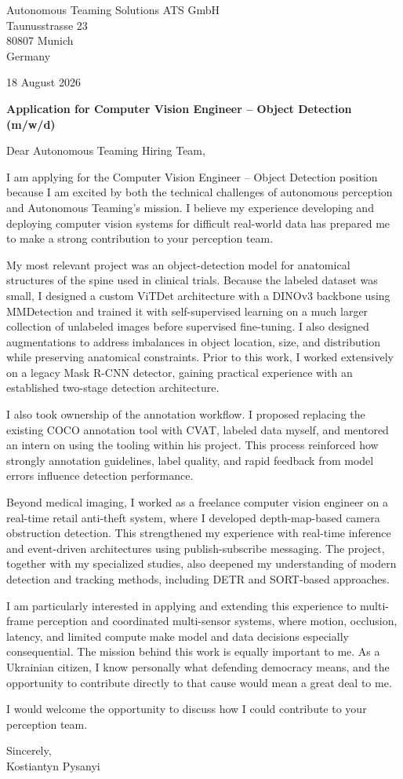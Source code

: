 \documentclass[11pt,a4paper]{article}
\begin{document}
Autonomous Teaming Solutions ATS GmbH\\
Taunusstrasse 23\\
80807 Munich\\
Germany

\begin{flushright}
18 August 2026
\end{flushright}

\textbf{Application for Computer Vision Engineer -- Object Detection (m/w/d)}

Dear Autonomous Teaming Hiring Team,

I am applying for the Computer Vision Engineer -- Object Detection position because I am excited by both the technical challenges of autonomous perception and Autonomous Teaming's mission. I believe my experience developing and deploying computer vision systems for difficult real-world data has prepared me to make a strong contribution to your perception team.

My most relevant project was an object-detection model for anatomical structures of the spine used in clinical trials. Because the labeled dataset was small, I designed a custom ViTDet architecture with a DINOv3 backbone using MMDetection and trained it with self-supervised learning on a much larger collection of unlabeled images before supervised fine-tuning. I also designed augmentations to address imbalances in object location, size, and distribution while preserving anatomical constraints. Prior to this work, I worked extensively on a legacy Mask R-CNN detector, gaining practical experience with an established two-stage detection architecture.

I also took ownership of the annotation workflow. I proposed replacing the existing COCO annotation tool with CVAT, labeled data myself, and mentored an intern on using the tooling within his project. This process reinforced how strongly annotation guidelines, label quality, and rapid feedback from model errors influence detection performance.

Beyond medical imaging, I worked as a freelance computer vision engineer on a real-time retail anti-theft system, where I developed depth-map-based camera obstruction detection. This strengthened my experience with real-time inference and event-driven architectures using publish-subscribe messaging. The project, together with my specialized studies, also deepened my understanding of modern detection and tracking methods, including DETR and SORT-based approaches.

I am particularly interested in applying and extending this experience to multi-frame perception and coordinated multi-sensor systems, where motion, occlusion, latency, and limited compute make model and data decisions especially consequential. The mission behind this work is equally important to me. As a Ukrainian citizen, I know personally what defending democracy means, and the opportunity to contribute directly to that cause would mean a great deal to me.

I would welcome the opportunity to discuss how I could contribute to your perception team.

Sincerely,\\
Kostiantyn Pysanyi
\end{document}
